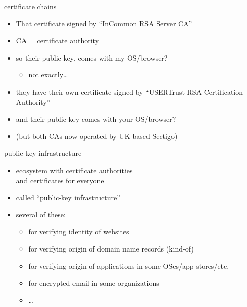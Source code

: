 \begin{frame}{certificate chains}
    \begin{itemize}
    \item That certificate signed by ``InCommon RSA Server CA''
    \item CA = certificate authority
    \vspace{.5cm}
    \item so their public key, comes with my OS/browser?
        \begin{itemize}
        \item not exactly\ldots
        \end{itemize}
    \item they have their own certificate signed by ``USERTrust RSA Certification Authority''
    \item and their public key comes with your OS/browser?
    \vspace{.5cm}
    \item (but both CAs now operated by UK-based Sectigo)
    \end{itemize}
\end{frame}

\begin{frame}{public-key infrastructure}
    \begin{itemize}
    \item ecosystem with certificate authorities \\
        and certificates for everyone
    \item called ``public-key infrastructure''
        \vspace{.5cm}
    \item several of these:
        \begin{itemize}
        \item for verifying identity of websites 
        \item for verifying origin of domain name records (kind-of)
        \item for verifying origin of applications in some OSes/app stores/etc.
        \item for encrypted email in some organizations
        \item \ldots
        \end{itemize}
    \end{itemize}
\end{frame}
